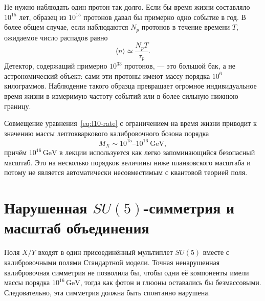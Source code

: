 Не нужно наблюдать один протон так долго. Если бы время жизни составляло \(10^{15}\) лет, образец из \(10^{15}\) протонов давал бы примерно одно событие в год. В более общем случае, если наблюдаются \(N_p\) протонов в течение времени \(T\), ожидаемое число распадов равно
\begin{equation}
\langle n\rangle\simeq\frac{N_pT}{\tau_p}.
\label{eq:l10-event-count}
\end{equation}
Детектор, содержащий примерно \(10^{33}\) протонов, — это большой бак, а не астрономический объект: сами эти протоны имеют массу порядка \(10^6\) килограммов. Наблюдение такого образца превращает огромное индивидуальное время жизни в измеримую частоту событий или в более сильную нижнюю границу.

Совмещение уравнения~\eqref{eq:l10-rate} с ограничением на время жизни приводит к значению массы лептокваркового калибровочного бозона порядка
\begin{equation}
M_X\sim10^{15}\text{--}10^{16}\ \mathrm{GeV},
\label{eq:l10-mx}
\end{equation}
причём \(10^{16}\,\mathrm{GeV}\) в лекции используется как легко запоминающийся безопасный масштаб. Это на несколько порядков величины ниже планковского масштаба и потому не является автоматически несовместимым с квантовой теорией поля.

\section{Нарушенная \texorpdfstring{\(SU(5)\)}{SU(5)}-симметрия и масштаб объединения}

Поля \(X/Y\) входят в один присоединённый мультиплет \(SU(5)\) вместе с калибровочными полями Стандартной модели. Точная ненарушенная калибровочная симметрия не позволила бы, чтобы одни её компоненты имели массы порядка \(10^{16}\,\mathrm{GeV}\), тогда как фотон и глюоны оставались бы безмассовыми. Следовательно, эта симметрия должна быть спонтанно нарушена.

\begin{classroomqa}
\end{classroomqa}

